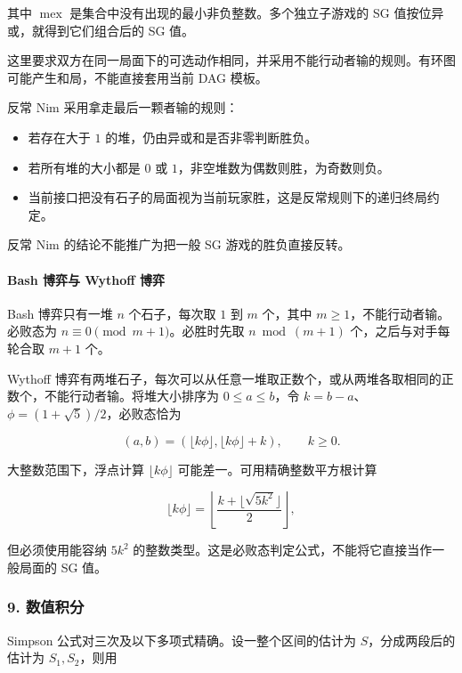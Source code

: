 其中 \(\operatorname{mex}\) 是集合中没有出现的最小非负整数。多个独立子游戏的 SG 值按位异或，就得到它们组合后的 SG 值。

这里要求双方在同一局面下的可选动作相同，并采用不能行动者输的规则。有环图可能产生和局，不能直接套用当前 DAG 模板。

反常 Nim 采用拿走最后一颗者输的规则：

\begin{itemize}
\tightlist
\item
  若存在大于 \(1\) 的堆，仍由异或和是否非零判断胜负。
\item
  若所有堆的大小都是 \(0\) 或 \(1\)，非空堆数为偶数则胜，为奇数则负。
\item
  当前接口把没有石子的局面视为当前玩家胜，这是反常规则下的递归终局约定。
\end{itemize}

反常 Nim 的结论不能推广为把一般 SG 游戏的胜负直接反转。

\hypertarget{bash-ux535aux5f08ux4e0e-wythoff-ux535aux5f08}{%
\paragraph{Bash 博弈与 Wythoff 博弈}\label{bash-ux535aux5f08ux4e0e-wythoff-ux535aux5f08}}

Bash 博弈只有一堆 \(n\) 个石子，每次取 \(1\) 到 \(m\) 个，其中 \(m\ge1\)，不能行动者输。必败态为 \(n\equiv0\pmod{m+1}\)。必胜时先取 \(n\bmod(m+1)\) 个，之后与对手每轮合取 \(m+1\) 个。

Wythoff 博弈有两堆石子，每次可以从任意一堆取正数个，或从两堆各取相同的正数个，不能行动者输。将堆大小排序为 \(0\le a\le b\)，令 \(k=b-a\)、\(\phi=(1+\sqrt5)/2\)，必败态恰为

\[
(a,b)=\left(\lfloor k\phi\rfloor,\lfloor k\phi\rfloor+k\right),\qquad k\ge0.
\]

大整数范围下，浮点计算 \(\lfloor k\phi\rfloor\) 可能差一。可用精确整数平方根计算

\[
\lfloor k\phi\rfloor
=\left\lfloor\frac{k+\lfloor\sqrt{5k^2}\rfloor}{2}\right\rfloor,
\]

但必须使用能容纳 \(5k^2\) 的整数类型。这是必败态判定公式，不能将它直接当作一般局面的 SG 值。

\hypertarget{ux6570ux503cux79efux5206}{%
\subsubsection{9. 数值积分}\label{ux6570ux503cux79efux5206}}

Simpson 公式对三次及以下多项式精确。设一整个区间的估计为 \(S\)，分成两段后的估计为 \(S_1,S_2\)，则用

